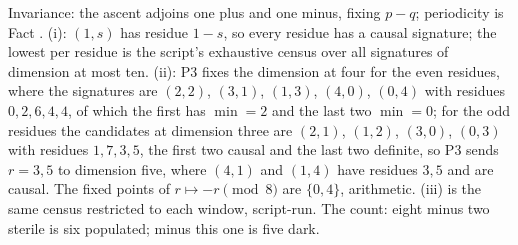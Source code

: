 Invariance: the ascent adjoins one plus and one minus, fixing $p - q$; periodicity is Fact . (i): $(1,s)$ has residue $1 - s$, so every residue has a causal signature; the lowest per residue is the script's exhaustive census over all signatures of dimension at most ten. (ii): P3 fixes the dimension at four for the even residues, where the signatures are $(2,2)$, $(3,1)$, $(1,3)$, $(4,0)$, $(0,4)$ with residues $0, 2, 6, 4, 4$, of which the first has $\min = 2$ and the last two $\min = 0$; for the odd residues the candidates at dimension three are $(2,1)$, $(1,2)$, $(3,0)$, $(0,3)$ with residues $1, 7, 3, 5$, the first two causal and the last two definite, so P3 sends $r = 3, 5$ to dimension five, where $(4,1)$ and $(1,4)$ have residues $3, 5$ and are causal. The fixed points of $r \mapsto -r \pmod 8$ are $\{0, 4\}$, arithmetic. (iii) is the same census restricted to each window, script-run. The count: eight minus two sterile is six populated; minus this one is five dark.
